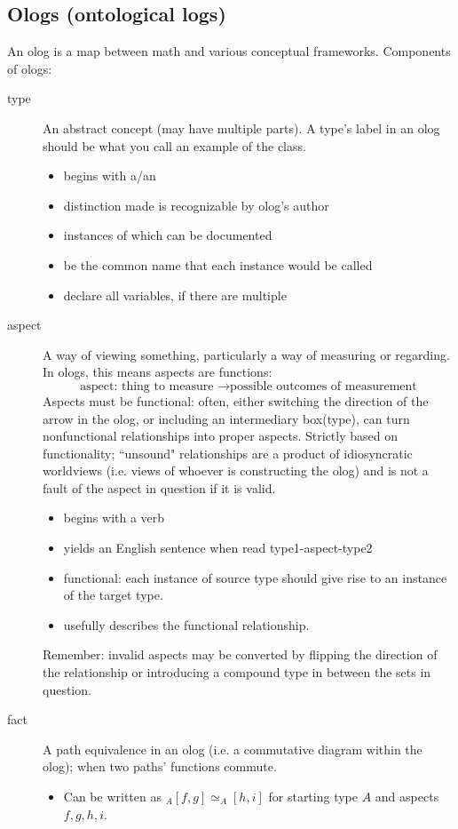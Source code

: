 \documentclass{article}
\begin{document}
\subsection{Ologs (ontological logs)}
An olog is a map between math and various conceptual frameworks.
Components of ologs:
\begin{description}
\item[type] An abstract concept (may have multiple parts). A type's label in an olog should be what you call an example of the class.
\begin{itemize}
\item begins with a/an
\item distinction made is recognizable by olog's author
\item instances of which can be documented
\item be the common name that each instance would be called
\item declare all variables, if there are multiple
\end{itemize}

\item[aspect] A way of viewing something, particularly a way of measuring or regarding. In ologs, this means aspects are functions:
\begin{equation*}
\text{aspect: thing to measure } \rightarrow \text{possible outcomes of measurement}
\end{equation*}
Aspects must be functional: often, either switching the direction of the arrow in the olog, or including an intermediary box(type), can turn nonfunctional relationships into proper aspects. Strictly based on functionality; ``unsound" relationships are a product of idiosyncratic worldviews (i.e. views of whoever is constructing the olog) and is not a fault of the aspect in question if it is valid.
\begin{itemize}
\item begins with a verb
\item yields an English sentence when read type1-aspect-type2
\item functional: each instance of source type should give rise to an instance of the target type.
\item usefully describes the functional relationship.
\end{itemize}
Remember: invalid aspects may be converted by flipping the direction of the relationship or introducing a compound type in between the sets in question.

\item[fact] A path equivalence in an olog (i.e. a commutative diagram within the olog); when two paths' functions commute.
\begin{itemize}
\item Can be written as $_{A}[f, g] \simeq _{A}[h, i]$ for starting type $A$ and aspects $f,g,h,i$.
\end{itemize}


\end{description}
\end{document}
